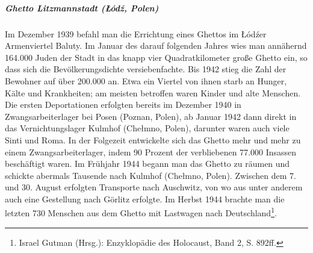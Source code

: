 \subparagraph{Ghetto Litzmannstadt (\L \'od\'z, Polen)}
Im Dezember 1939 befahl man die Errichtung eines Ghettos im \L \'od\'zer Armenviertel Baluty. Im Januar des darauf folgenden Jahres wies man annähernd 164.000 Juden der Stadt in das knapp vier Quadratkilometer große Ghetto ein, so dass sich die Bevölkerungsdichte versiebenfachte. Bis 1942 stieg die Zahl der Bewohner auf über 200.000 an. Etwa ein Viertel von ihnen starb an Hunger, Kälte und Krankheiten; am meisten betroffen waren Kinder und alte Menschen. Die ersten Deportationen erfolgten bereits im Dezember 1940 in Zwangsarbeiterlager bei Posen (Poznan, Polen), ab Januar 1942 dann direkt in das Vernichtungslager Kulmhof (Che\l mno, Polen), darunter waren auch viele Sinti und Roma. In der Folgezeit entwickelte sich das Ghetto mehr und mehr zu einem Zwangsarbeiterlager, indem 90 Prozent der verbliebenen 77.000 Insassen beschäftigt waren. Im Frühjahr 1944 begann man das Ghetto zu räumen und schickte abermals Tausende nach Kulmhof (Che\l mno, Polen). Zwischen dem 7. und 30. August erfolgten Transporte nach Auschwitz, von wo aus unter anderem auch eine Gestellung nach Görlitz erfolgte. Im Herbst 1944 brachte man die letzten 730 Menschen aus dem Ghetto mit Lastwagen nach Deutschland\footnote{Israel Gutman (Hrsg.): Enzyklopädie des Holocaust, Band 2, S. 892ff.}.

